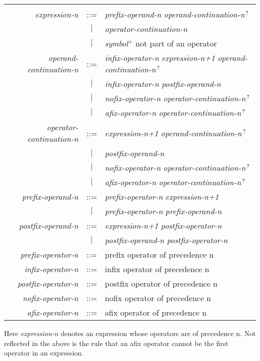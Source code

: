 \documentclass[12pt]{article}
\newcommand{\PLUS}[1][]{{$^{+#1}$}}
\newcommand{\QMARK}{{$^{\,\mbox{\footnotesize ?}}$}}
\begin{document}
\begin{tabular}{rcl}
\hspace*{1.7in} \\[-2ex]
{\em expression-n}
    & ::= & {\em prefix-operand-n} {\em operand-continuation-n}\QMARK{} \\
    & $|$ & {\em operator-continuation-n} \\
    & $|$ & {\em symbol}\PLUS{} not part of an operator \\
{\em operand-continuation-n}
    & ::= & {\em infix-operator-n} {\em expression-n+1}
                                   {\em operand-continuation-n}\QMARK{} \\
    & $|$ & {\em infix-operator-n} {\em postfix-operand-n} \\
    & $|$ & {\em nofix-operator-n} {\em operator-continuation-n}\QMARK{} \\
    & $|$ & {\em afix-operator-n} {\em operator-continuation-n}\QMARK{} \\
{\em operator-continuation-n}
    & ::= & {\em expression-n+1} {\em operand-continuation-n}\QMARK{} \\
    & $|$ & {\em postfix-operand-n} \\
    & $|$ & {\em nofix-operator-n} {\em operator-continuation-n}\QMARK{} \\
    & $|$ & {\em afix-operator-n} {\em operator-continuation-n}\QMARK{} \\
{\em prefix-operand-n}
    & ::= & {\em prefix-operator-n} {\em expression-n+1} \\
    & $|$ & {\em prefix-operator-n} {\em prefix-operand-n} \\
{\em postfix-operand-n}
    & ::= & {\em expression-n+1} {\em postfix-operator-n} \\
    & $|$ & {\em postfix-operand-n} {\em postfix-operator-n} \\
{\em prefix-operator-n}
    & ::= & prefix operator of precedence n \\
{\em infix-operator-n}
    & ::= & infix operator of precedence n \\
{\em postfix-operator-n}
    & ::= & postfix operator of precedence n \\
{\em nofix-operator-n}
    & ::= & nofix operator of precedence n \\
{\em afix-operator-n}
    & ::= & afix operator of precedence n \\
\end{tabular}

Here {\em expression-n} denotes an expression whose operators are of
precedence n.
Not reflected in the above is the rule that an afix operator cannot
be the first operator in an expression.
\end{document}
